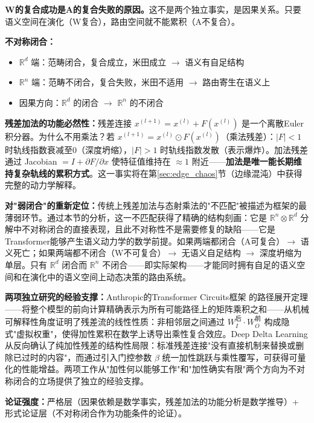 \documentclass[11pt,a4paper]{article}
\theoremstyle{definition}
\begin{document}
\textbf{W的复合成功是A的复合失败的原因。}这不是两个独立事实，是因果关系。只要语义空间在演化（W复合），路由空间就不能累积（A不复合）。

\textbf{不对称闭合：}
\begin{itemize}[leftmargin=*,itemsep=0.2em]
    \item $\mathbb{R}^d$ 端：范畴闭合，复合成立，米田成立 $\to$ 语义有自足结构
    \item $\mathbb{R}^n$ 端：范畴不闭合，复合失败，米田不适用 $\to$ 路由寄生在语义上
    \item 因果方向：$\mathbb{R}^d$ 的闭合 $\to$ $\mathbb{R}^n$ 的不闭合
\end{itemize}

\textbf{残差加法的功能必然性：}残差连接 $x^{(l+1)} = x^{(l)} + F(x^{(l)})$ 是一个离散Euler积分器。为什么不用乘法？若 $x^{(l+1)} = x^{(l)} \odot F(x^{(l)})$（乘法残差）：$|F| < 1$ 时轨线指数衰减至0（深度坍缩），$|F| > 1$ 时轨线指数发散（表示爆炸）。加法残差通过 Jacobian $= I + \partial F/\partial x$ 使特征值维持在 $\approx 1$ 附近——\textbf{加法是唯一能长期维持复杂轨线的累积方式}。这一事实将在第\ref{sec:edge_chaos}节（边缘混沌）中获得完整的动力学解释。

\textbf{对"弱闭合"的重新定位：}传统上残差加法与态射乘法的"不匹配"被描述为框架的最薄弱环节。通过本节的分析，这一不匹配获得了精确的结构刻画：它是 $\mathbb{R}^n \otimes \mathbb{R}^d$ 分解中不对称闭合的直接表现，且此不对称性不是需要修复的缺陷——它是Transformer能够产生语义动力学的数学前提。如果两端都闭合（A可复合）$\to$ 语义死亡；如果两端都不闭合（W不可复合）$\to$ 无语义自足结构 $\to$ 深度坍缩为单层。只有 $\mathbb{R}^d$ 闭合而 $\mathbb{R}^n$ 不闭合——即实际架构——才能同时拥有自足的语义空间和在演化中的语义空间上动态决策的路由系统。

\textbf{两项独立研究的经验支撑：}Anthropic的Transformer Circuits框架 \cite{elhage2022transformer_circuits} 的路径展开定理——将整个模型的前向计算精确表示为所有可能路径上的矩阵乘积之和——从机械可解释性角度证明了残差流的线性性质：非相邻层之间通过 $W_I^{\text{后}} \cdot W_O^{\text{前}}$ 构成隐式"虚拟权重"，使得加性累积在数学上诱导出乘性复合效应。Deep Delta Learning \cite{zhang2025deep_delta} 从反向确认了纯加性残差的结构性局限：标准残差连接"没有直接机制来替换或删除已过时的内容"，而通过引入门控参数 $\beta$ 统一加性跳跃与乘性覆写，可获得可量化的性能增益。两项工作从"加性何以能够工作"和"加性确实有限"两个方向为不对称闭合的立场提供了独立的经验支撑。

\textbf{论证强度：}严格层（因果依赖是数学事实，残差加法的功能分析是数学推导）+ 形式论证层（不对称闭合作为功能条件的论证）。
\end{document}
